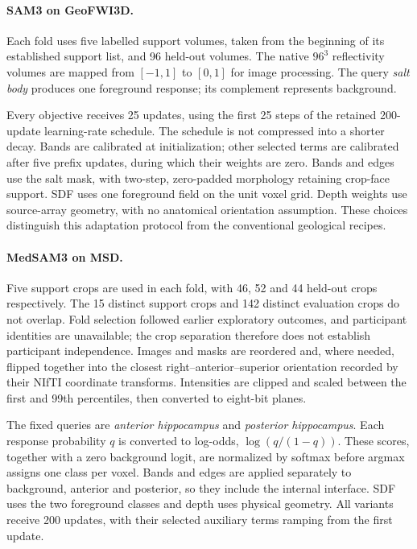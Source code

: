 \documentclass[12pt,a4paper]{article}
\begin{document}
\paragraph{SAM3 on GeoFWI3D.}\label{sec:sam3-methods}
Each fold uses five labelled support volumes, taken from the beginning
of its established support list, and 96 held-out volumes. The native
$96^3$ reflectivity volumes are mapped from $[-1,1]$ to $[0,1]$ for
image processing. The query \emph{salt body} produces one foreground
response; its complement represents background.

Every objective receives 25 updates, using the first 25 steps of the
retained 200-update learning-rate schedule. The schedule is not compressed
into a shorter decay. Bands are calibrated at initialization; other selected
terms are calibrated after five prefix updates, during which their weights
are zero. Bands and edges use the salt mask, with two-step, zero-padded
morphology retaining crop-face support. SDF uses one foreground field on the
unit voxel grid. Depth weights use source-array geometry, with no anatomical
orientation assumption. These choices distinguish this adaptation protocol
from the conventional geological recipes.

\paragraph{MedSAM3 on MSD.}\label{sec:medsam-methods}
Five support crops are used in each fold, with 46, 52 and 44 held-out
crops respectively. The 15 distinct support crops and 142 distinct
evaluation crops do not overlap. Fold selection followed earlier
exploratory outcomes, and participant identities are unavailable; the
crop separation therefore does not establish participant independence.
Images and masks are reordered and, where needed, flipped together
into the closest right--anterior--superior orientation recorded by their
NIfTI coordinate transforms. Intensities are clipped and scaled between the first and
99th percentiles, then converted to eight-bit planes.

The fixed queries are \emph{anterior hippocampus} and \emph{posterior
hippocampus}. Each response probability $q$ is converted to log-odds,
$\log(q/(1-q))$. These scores, together with a zero background logit, are
normalized by softmax before argmax assigns one class per voxel. Bands and
edges are applied separately to background, anterior and posterior, so they
include the internal interface. SDF uses the two foreground classes and
depth uses physical geometry. All variants receive 200 updates, with their
selected auxiliary terms ramping from the first update.
\end{document}
